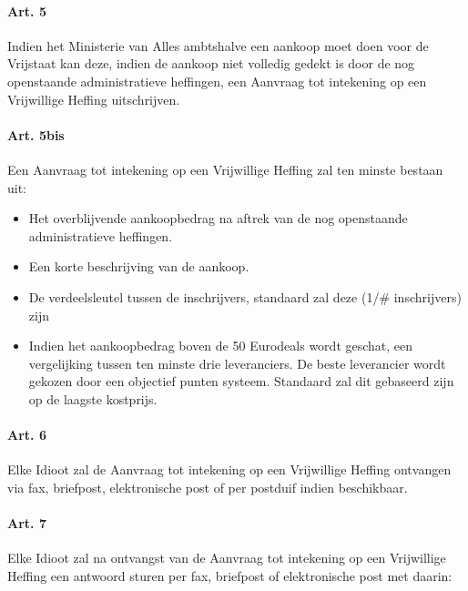 \hypertarget{art.-5}{%
\paragraph{Art. 5}\label{art.-5}}

Indien het Ministerie van Alles ambtshalve een aankoop moet doen voor de
Vrijstaat kan deze, indien de aankoop niet volledig gedekt is door de
nog openstaande administratieve heffingen, een Aanvraag tot intekening
op een Vrijwillige Heffing uitschrijven.

\hypertarget{art.-5bis}{%
\paragraph{Art. 5bis}\label{art.-5bis}}

Een Aanvraag tot intekening op een Vrijwillige Heffing zal ten minste
bestaan uit:

\begin{itemize}
\tightlist
\item
  Het overblijvende aankoopbedrag na aftrek van de nog openstaande
  administratieve heffingen.
\item
  Een korte beschrijving van de aankoop.
\item
  De verdeelsleutel tussen de inschrijvers, standaard zal deze (1/\#
  inschrijvers) zijn
\item
  Indien het aankoopbedrag boven de 50 Eurodeals wordt geschat, een
  vergelijking tussen ten minste drie leveranciers. De beste leverancier
  wordt gekozen door een objectief punten systeem. Standaard zal dit
  gebaseerd zijn op de laagste kostprijs.
\end{itemize}

\hypertarget{art.-6}{%
\paragraph{Art. 6}\label{art.-6}}

Elke Idioot zal de Aanvraag tot intekening op een Vrijwillige Heffing
ontvangen via fax, briefpost, elektronische post of per postduif indien
beschikbaar.

\hypertarget{art.-7}{%
\paragraph{Art. 7}\label{art.-7}}

Elke Idioot zal na ontvangst van de Aanvraag tot intekening op een
Vrijwillige Heffing een antwoord sturen per fax, briefpost of
elektronische post met daarin:

